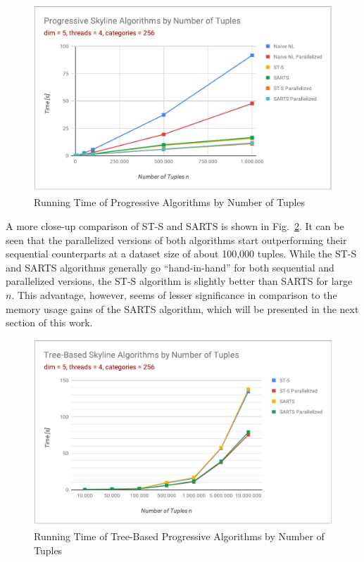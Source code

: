 \begin{figure}[h]
	\centering
	\includegraphics[width=1\linewidth]{figures/progressive-n}
	\caption{Running Time of Progressive Algorithms by Number of Tuples}
	\label{fig:progressive-n}
\end{figure}

A more close-up comparison of ST-S and SARTS is shown in Fig.~\ref{fig:progressive-n-2}. It can be seen that the parallelized versions of both algorithms start outperforming their sequential counterparts at a dataset size of about 100,000 tuples. While the ST-S and SARTS algorithms generally go ``hand-in-hand'' for both sequential and parallelized versions, the ST-S algorithm is slightly better than SARTS for large $n$. This advantage, however, seems of lesser significance in comparison to the memory usage gains of the SARTS algorithm, which will be presented in the next section of this work. 

\begin{figure}[H]
	\centering
	\includegraphics[width=1\linewidth]{figures/progressive-n-2}
	\caption{Running Time of Tree-Based Progressive Algorithms by Number of Tuples}
	\label{fig:progressive-n-2}
\end{figure}

